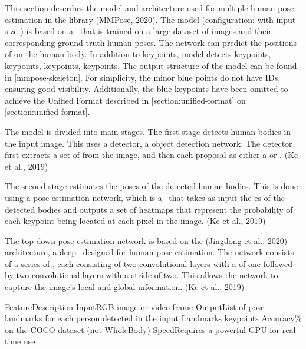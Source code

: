 
This section describes the model and architecture used for multiple human pose estimation in the  library (\scc MMPose, 2020). The model (configuration:  with input size ) is based on a \CNN\ that is trained on a large dataset of images and their corresponding ground truth human poses. The network can predict the positions of  on the human body. In addition to  keypoints, model detects  keypoints,  keypoints,  keypoints,  keypoints. The output structure of the  model can be found in [mmpose-skeleton]. For simplicity, the minor blue points do not have IDs, ensuring good visibility. Additionally, the blue keypoints have been omitted to achieve the Unified Format described in [section:unified-format] on [section:unified-format].

The model is divided into  main stages. The first stage detects human bodies in the input image. This uses a  detector, a  object detection network. The detector first extracts a set of  from the image, and then  each proposal as either a  or . (\scc Ke et al., 2019)

The second stage estimates the poses of the detected human bodies. This is done using a  pose estimation network, which is a \CNN\ that takes as input the \BBOX\-es of the detected bodies and outputs a set of heatmaps that represent the probability of each keypoint being located at each pixel in the image. (\scc Ke et al., 2019)

The top-down pose estimation network is based on the  (\scc Jingdong et al., 2020) architecture, a deep \CNN\ designed for human pose estimation. The network consists of a series of , each consisting of two convolutional layers with a  of one followed by two convolutional layers with a stride of two. This allows the network to capture the image's local and global information. (\scc Ke et al., 2019)

 \setupTABLE[r][1][style=bold]
 \setupTABLE[c][each][offset=3dd]
 \setupTABLE[frame=off]
 \setupTABLE[r][1][topframe=on,bottomframe=on]
 \setupTABLE[r][6][bottomframe=on]
 \setupTABLE[c][each][leftframe=on]
 \setupTABLE[c][1][leftframe=off]
 \bTR\bTD Feature\eTD\bTD Description\eTD\eTR
 \bTR\bTD Input\eTD\bTD RGB image or video frame\eTD\eTR
 \bTR\bTD Output\eTD\bTD List of pose landmarks for each person detected in the input\eTD\eTR
 \bTR\bTD Landmarks\eTD{} keypoints\eTD\eTR
 \bTR\bTD Accuracy\eTD{}\% on the COCO dataset (not WholeBody)\eTD\eTR
 \bTR\bTD Speed\eTD\bTD Requires a powerful GPU for real-time use\eTD\eTR

